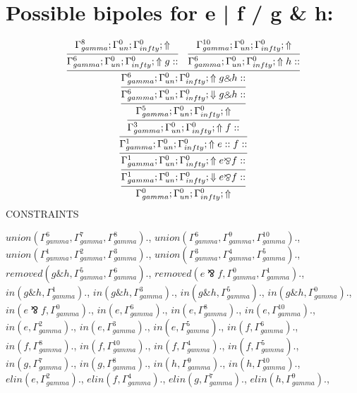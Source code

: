 \documentclass[a4paper, 11pt]{article}
\begin{document}
\section{Possible bipoles for e | f / g \& h:} 

\[
\infer{\Gamma_{ gamma}^{0} ; \Gamma_{un}^{0} ; \Gamma_{ infty}^{0} ;  \Uparrow }
{\infer{\Gamma_{ gamma}^{1} ; \Gamma_{un}^{0} ; \Gamma_{ infty}^{0} ;  \Downarrow e \bindnasrepma f :: }
{\infer{\Gamma_{ gamma}^{1} ; \Gamma_{un}^{0} ; \Gamma_{ infty}^{0} ;  \Uparrow e \bindnasrepma f :: }
{\infer{\Gamma_{ gamma}^{1} ; \Gamma_{un}^{0} ; \Gamma_{ infty}^{0} ;  \Uparrow e :: f :: }
{\infer{\Gamma_{ gamma}^{3} ; \Gamma_{un}^{0} ; \Gamma_{ infty}^{0} ;  \Uparrow f :: }
{\infer{\Gamma_{ gamma}^{5} ; \Gamma_{un}^{0} ; \Gamma_{ infty}^{0} ;  \Uparrow }
{\infer{\Gamma_{ gamma}^{6} ; \Gamma_{un}^{0} ; \Gamma_{ infty}^{0} ;  \Downarrow g \binampersand h :: }
{\infer{\Gamma_{ gamma}^{6} ; \Gamma_{un}^{0} ; \Gamma_{ infty}^{0} ;  \Uparrow g \binampersand h :: }
{\infer{\Gamma_{ gamma}^{6} ; \Gamma_{un}^{0} ; \Gamma_{ infty}^{0} ;  \Uparrow g :: }
{\Gamma_{ gamma}^{8} ; \Gamma_{un}^{0} ; \Gamma_{ infty}^{0} ;  \Uparrow }
&
\infer{\Gamma_{ gamma}^{6} ; \Gamma_{un}^{0} ; \Gamma_{ infty}^{0} ;  \Uparrow h :: }
{\Gamma_{ gamma}^{10} ; \Gamma_{un}^{0} ; \Gamma_{ infty}^{0} ;  \Uparrow }}}}}}}}}
\]
CONSTRAINTS

$union(\Gamma_{gamma}^{6}, \Gamma_{gamma}^{7}, \Gamma_{gamma}^{8}).$, $union(\Gamma_{gamma}^{6}, \Gamma_{gamma}^{9}, \Gamma_{gamma}^{10}).$, $union(\Gamma_{gamma}^{1}, \Gamma_{gamma}^{2}, \Gamma_{gamma}^{3}).$, $union(\Gamma_{gamma}^{3}, \Gamma_{gamma}^{4}, \Gamma_{gamma}^{5}).$, $removed(g \binampersand h, \Gamma_{gamma}^{5}, \Gamma_{gamma}^{6}).$, $removed(e \bindnasrepma f, \Gamma_{gamma}^{0}, \Gamma_{gamma}^{1}).$, $in(g \binampersand h, \Gamma_{gamma}^{1}).$, $in(g \binampersand h, \Gamma_{gamma}^{3}).$, $in(g \binampersand h, \Gamma_{gamma}^{5}).$, $in(g \binampersand h, \Gamma_{gamma}^{0}).$, $in(e \bindnasrepma f, \Gamma_{gamma}^{0}).$, $in(e, \Gamma_{gamma}^{6}).$, $in(e, \Gamma_{gamma}^{8}).$, $in(e, \Gamma_{gamma}^{10}).$, $in(e, \Gamma_{gamma}^{2}).$, $in(e, \Gamma_{gamma}^{3}).$, $in(e, \Gamma_{gamma}^{5}).$, $in(f, \Gamma_{gamma}^{6}).$, $in(f, \Gamma_{gamma}^{8}).$, $in(f, \Gamma_{gamma}^{10}).$, $in(f, \Gamma_{gamma}^{4}).$, $in(f, \Gamma_{gamma}^{5}).$, $in(g, \Gamma_{gamma}^{7}).$, $in(g, \Gamma_{gamma}^{8}).$, $in(h, \Gamma_{gamma}^{9}).$, $in(h, \Gamma_{gamma}^{10}).$, $elin(e, \Gamma_{gamma}^{2}).$, $elin(f, \Gamma_{gamma}^{4}).$, $elin(g, \Gamma_{gamma}^{7}).$, $elin(h, \Gamma_{gamma}^{9}).$, 
\end{document}
